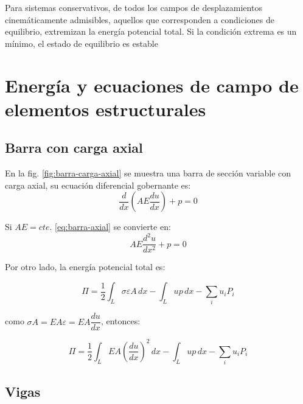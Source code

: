 \begin{kaobox}[frametitle=Principio de mínima energía potencial]
	Para sistemas conservativos, de todos los campos de desplazamientos cinemáticamente admisibles, aquellos que corresponden a condiciones de equilibrio, extremizan la energía potencial total. Si la condición extrema es un mínimo, el estado de equilibrio es estable
\end{kaobox}

\section{Energía y ecuaciones de campo de elementos estructurales}

\subsection{Barra con carga axial}

En la fig. \ref{fig:barra-carga-axial} se muestra una barra de sección variable con carga axial, su ecuación diferencial gobernante es:
\begin{equation}
	\dfrac{d}{dx} \left( AE \dfrac{du}{dx} \right) + p = 0
	\label{eq:barra-axial}
\end{equation}


Si $AE = cte.$ \eqref{eq:barra-axial} se convierte en:
\begin{equation}
	AE \dfrac{d^2u}{dx^2} + p = 0
\end{equation}

Por otro lado, la energía potencial total es:

\begin{equation}
	\Pi = \dfrac{1}{2} \int_L \sigma \varepsilon A \, dx - \int_L up\, dx - \sum_i u_i P_i
	\label{eq:energia_unidimensionales}
\end{equation}

como $\sigma A = EA \varepsilon = EA \dfrac{du}{dx}$, entonces:

\begin{equation}
	\Pi = \dfrac{1}{2} \int_L EA \left( \dfrac{du}{dx} \right)^2 \, dx - \int_L up\, dx - \sum_i u_i P_i
	\label{eq:eptuni}
\end{equation}

\subsection{Vigas}

